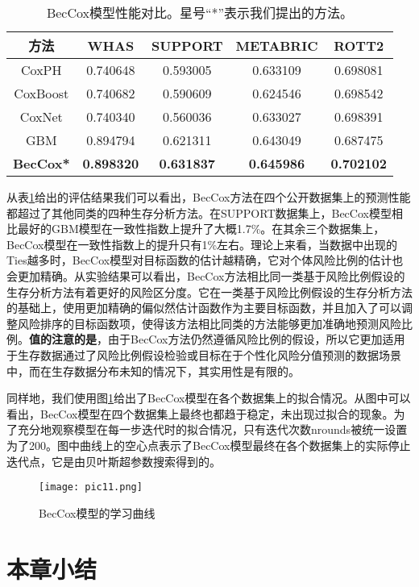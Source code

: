 \begin{table}[h]
\caption{BecCox模型性能对比。星号“*”表示我们提出的方法。}
\begin{tabular}{ccccc}
\toprule
方法 & WHAS & SUPPORT & METABRIC & ROTT2 \\ 
\midrule
CoxPH & 0.740648 & 0.593005 & 0.633109 & 0.698081 \\
CoxBoost & 0.740682 & 0.590609 & 0.624546 & 0.698542 \\
CoxNet & 0.740340 & 0.560036 & 0.633027 & 0.698391 \\
GBM & 0.894794 & 0.621311 & 0.643049 & 0.687475 \\
\textbf{BecCox*} & \textbf{0.898320} & \textbf{0.631837} & \textbf{0.645986} & \textbf{0.702102} \\
\bottomrule
\end{tabular}
\label{table05}
\end{table}

从表\ref{table05}给出的评估结果我们可以看出，BecCox方法在四个公开数据集上的预测性能都超过了其他同类的四种生存分析方法。在SUPPORT数据集上，BecCox模型相比最好的GBM模型在一致性指数上提升了大概1.7\%。在其余三个数据集上，BecCox模型在一致性指数上的提升只有1\%左右。理论上来看，当数据中出现的Ties越多时，BecCox模型对目标函数的估计越精确，它对个体风险比例的估计也会更加精确。从实验结果可以看出，BecCox方法相比同一类基于风险比例假设的生存分析方法有着更好的风险区分度。它在一类基于风险比例假设的生存分析方法的基础上，使用更加精确的偏似然估计函数作为主要目标函数，并且加入了可以调整风险排序的目标函数项，使得该方法相比同类的方法能够更加准确地预测风险比例。\textbf{值的注意的是}，由于BecCox方法仍然遵循风险比例的假设，所以它更加适用于生存数据通过了风险比例假设检验或目标在于个性化风险分值预测的数据场景中，而在生存数据分布未知的情况下，其实用性是有限的。

同样地，我们使用图\ref{pic11}给出了BecCox模型在各个数据集上的拟合情况。从图中可以看出，BecCox模型在四个数据集上最终也都趋于稳定，未出现过拟合的现象。为了充分地观察模型在每一步迭代时的拟合情况，只有迭代次数nrounds被统一设置为了200。图中曲线上的空心点表示了BecCox模型最终在各个数据集上的实际停止迭代点，它是由贝叶斯超参数搜索得到的。

\begin{figure}[H]
\texttt{[image: pic11.png]}
\caption{BecCox模型的学习曲线}
\label{pic11}
\end{figure}

\section{本章小结}

